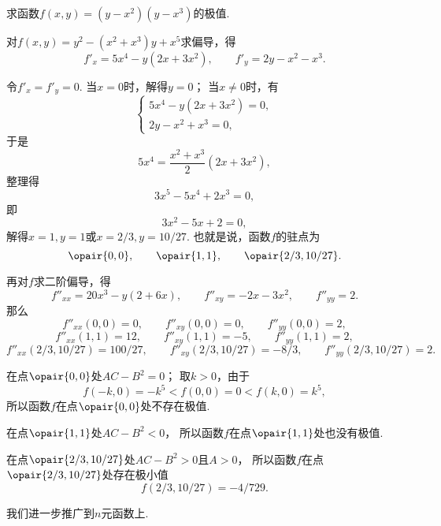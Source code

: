 \begin{example}
求函数\(f(x,y) = (y-x^2)(y-x^3)\)的极值.
\begin{solution}
对\(f(x,y) = y^2 - (x^2+x^3) y + x^5\)求偏导，得\[
f'_x = 5x^4 - y(2x+3x^2),
\qquad
f'_y = 2y - x^2 - x^3.
\]

令\(f'_x = f'_y = 0\).
当\(x=0\)时，解得\(y = 0\)；
当\(x\neq0\)时，有\[
\begin{cases}
5x^4-y(2x+3x^2) = 0, \\
2y-x^2+x^3 = 0,
\end{cases}
\]于是\[
5x^4 = \frac{x^2+x^3}{2}(2x+3x^2),
\]整理得\[
3x^5-5x^4+2x^3=0,
\]即\[
3x^2-5x+2=0,
\]解得\(x=1,y=1\)或\(x=2/3,y=10/27\).
也就是说，函数\(f\)的驻点为\[
\opair{0,0}, \qquad
\opair{1,1}, \qquad
\opair{2/3,10/27}.
\]

再对\(f\)求二阶偏导，得\[
f''_{xx} = 20x^3 - y(2+6x),
\qquad
f''_{xy} = -2x-3x^2,
\qquad
f''_{yy} = 2.
\]
那么
\[
f''_{xx}(0,0) = 0,
\qquad
f''_{xy}(0,0) = 0,
\qquad
f''_{yy}(0,0) = 2,
\]\[
f''_{xx}(1,1) = 12,
\qquad
f''_{xy}(1,1) = -5,
\qquad
f''_{yy}(1,1) = 2,
\]\[
f''_{xx}(2/3,10/27) = 100/27,
\qquad
f''_{xy}(2/3,10/27) = -8/3,
\qquad
f''_{yy}(2/3,10/27) = 2.
\]

在点\(\opair{0,0}\)处\(AC-B^2 = 0\)；
取\(k>0\)，由于\[
f(-k,0) = -k^5 < f(0,0) = 0 < f(k,0) = k^5,
\]所以函数\(f\)在点\(\opair{0,0}\)处不存在极值.

在点\(\opair{1,1}\)处\(AC-B^2 < 0\)，%
所以函数\(f\)在点\(\opair{1,1}\)处也没有极值.

在点\(\opair{2/3,10/27}\)处\(AC-B^2 > 0\)且\(A>0\)，%
所以函数\(f\)在点\(\opair{2/3,10/27}\)处存在极小值\[
f(2/3,10/27) = -4/729.
\]
\end{solution}
\end{example}

我们进一步推广到\(n\)元函数上.
\begingroup
\def\x{\mat{X}}
\def\X#1{\x_{#1}}
\def\z{\mat{0}}

